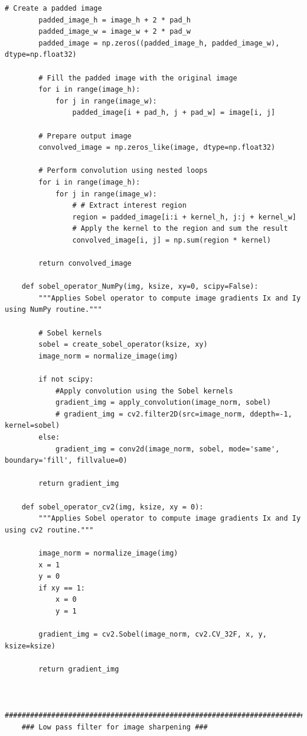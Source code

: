 \documentclass[11pt, conference, letterpaper]{IEEEtran}
\begin{document}
\begin{lstlisting}[style=python, caption={\texttt{image\_utils.py}}, label={lst:iutils}]
        # Create a padded image
        padded_image_h = image_h + 2 * pad_h
        padded_image_w = image_w + 2 * pad_w
        padded_image = np.zeros((padded_image_h, padded_image_w), dtype=np.float32)
    
        # Fill the padded image with the original image
        for i in range(image_h):
            for j in range(image_w):
                padded_image[i + pad_h, j + pad_w] = image[i, j]
    
        # Prepare output image
        convolved_image = np.zeros_like(image, dtype=np.float32)
    
        # Perform convolution using nested loops
        for i in range(image_h):
            for j in range(image_w):
                # # Extract interest region
                region = padded_image[i:i + kernel_h, j:j + kernel_w]
                # Apply the kernel to the region and sum the result
                convolved_image[i, j] = np.sum(region * kernel)
        
        return convolved_image
    
    def sobel_operator_NumPy(img, ksize, xy=0, scipy=False):
        """Applies Sobel operator to compute image gradients Ix and Iy using NumPy routine."""
        
        # Sobel kernels
        sobel = create_sobel_operator(ksize, xy)
        image_norm = normalize_image(img)
    
        if not scipy:
            #Apply convolution using the Sobel kernels
            gradient_img = apply_convolution(image_norm, sobel)
            # gradient_img = cv2.filter2D(src=image_norm, ddepth=-1, kernel=sobel)
        else:
            gradient_img = conv2d(image_norm, sobel, mode='same', boundary='fill', fillvalue=0)
            
        return gradient_img
    
    def sobel_operator_cv2(img, ksize, xy = 0):
        """Applies Sobel operator to compute image gradients Ix and Iy using cv2 routine."""
        
        image_norm = normalize_image(img)
        x = 1
        y = 0
        if xy == 1:
            x = 0
            y = 1
        
        gradient_img = cv2.Sobel(image_norm, cv2.CV_32F, x, y, ksize=ksize)
        
        return gradient_img
    
    
    ##########################################################################################
    ### Low pass filter for image sharpening ###
    

\end{lstlisting}
\end{document}
